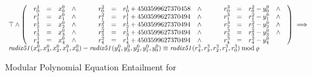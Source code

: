 \begin{figure}
  \centering
  \[
  \begin{array}{l}
  \top \wedge
  \left(
  \begin{array}{lclcl}
    \begin{array}{rclc}
      {r}^1_0 & = & {x}^0_0 & \wedge \\
      {r}^1_1 & = & {x}^0_1 & \wedge \\
      {r}^1_2 & = & {x}^0_2 & \wedge \\
      {r}^1_3 & = & {x}^0_3 & \wedge \\
      {r}^1_4 & = & {x}^0_4 & \wedge \\
    \end{array}
    &\hspace{.01\textwidth}&
    \begin{array}{rclc}
      {r}^2_0 & = & {r}^1_0 + {4503599627370458} & \wedge \\
      {r}^2_1 & = & {r}^1_1 + {4503599627370494} & \wedge \\
      {r}^2_2 & = & {r}^1_2 + {4503599627370494} & \wedge \\
      {r}^2_3 & = & {r}^1_3 + {4503599627370494} & \wedge \\
      {r}^2_4 & = & {r}^1_4 + {4503599627370494} & \wedge\\
    \end{array}
    &\hspace{.01\textwidth}&
    \begin{array}{rclc}
      {r}^3_0 & = & {r}^2_0 - {y}^0_0 & \wedge \\
      {r}^3_1 & = & {r}^2_1 - {y}^0_1 & \wedge \\
      {r}^3_2 & = & {r}^2_2 - {y}^0_2 & \wedge \\
      {r}^3_3 & = & {r}^2_3 - {y}^0_3 & \wedge \\
      {r}^3_4 & = & {r}^2_4 - {y}^0_4
    \end{array}
  \end{array}
  \right) \implies \\
    \mathit{radix51}({x}^0_4, {x}^0_3, {x}^0_2, {x}^0_1, {x}^0_0) -
    \mathit{radix51}({y}^0_4, {y}^0_3, {y}^0_2, {y}^0_1, {y}^0_0)
    \equiv
    \mathit{radix51}({r}^3_4, {r}^3_3, {r}^3_2, {r}^3_1, {r}^3_0)
    \mod \myprime
  \end{array}
  \]
  \caption{Modular Polynomial Equation Entailment for }
  \label{figure:translation:subtraction-polynomial}
\end{figure}

